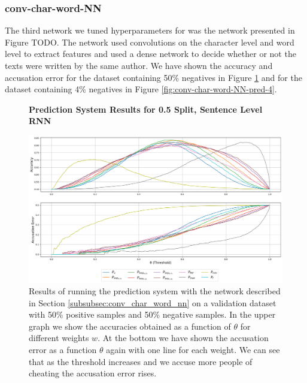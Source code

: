 \subsubsection{\glsdesc{conv-char-word-NN}}

The third network we tuned hyperparameters for was the network presented
in Figure TODO. The network used convolutions on the character level and
word level to extract features and used a dense network to decide whether or
not the texts were written by the same author. We have shown the accuracy
and accusation error for the dataset containing 50\% negatives in Figure
\ref{fig:conv-char-word-NN-pred-50} and for the dataset containing 4\%
negatives in Figure \ref{fig:conv-char-word-NN-pred-4}.

\begin{figure}
    \centering
    \textbf{Prediction System Results for 0.5 Split, Sentence Level RNN}\par\medskip
    \includegraphics[scale=0.35]{./pictures/experiments/conv_char_word_nn/prediction_system_50.png}
    \caption{Results of running the prediction system with the network described
        in Section \ref{subsubsec:conv_char_word_nn} on a validation dataset
        with 50\% positive samples and 50\% negative samples. In the upper graph
        we show the accuracies obtained as a function of $\theta$ for different
        weights $w$. At the bottom we have shown the accusation error as a
        function $\theta$ again with one line for each weight. We can see that
        as the threshold increases and we accuse more people of cheating the
        accusation error rises.}
    \label{fig:conv-char-word-NN-pred-50}
\end{figure}

